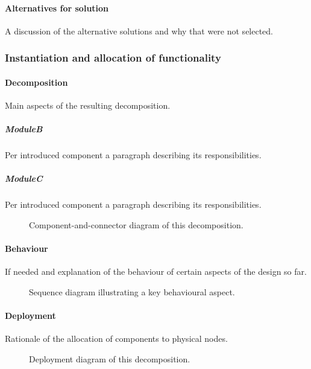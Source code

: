 \documentclass[a4paper,10pt]{article}
\begin{document}
\paragraph{Alternatives for solution}
A discussion of the alternative solutions and why that were not selected.

\subsubsection{Instantiation and allocation of functionality}
\paragraph{Decomposition}
Main aspects of the resulting decomposition.

\subparagraph{ModuleB}
Per introduced component a paragraph describing its responsibilities.

\subparagraph{ModuleC}
Per introduced component a paragraph describing its responsibilities.

\begin{figure}[!htp]
    \centering
    \caption{Component-and-connector diagram of this decomposition.
        }\label{fig:it1-cc_main}
\end{figure}

\paragraph{Behaviour}
If needed and explanation of the behaviour of certain aspects of the design so
far.

\begin{figure}[!htp]
    \centering
    \caption{Sequence diagram illustrating a key behavioural aspect.
        }\label{fig:it1-seq_aspect1}
\end{figure}

\paragraph{Deployment}
Rationale of the allocation of components to physical nodes.

\begin{figure}[!htp]
    \centering
    \caption{Deployment diagram of this decomposition.
        }\label{fig:it1-depl_main}
\end{figure}
\end{document}
